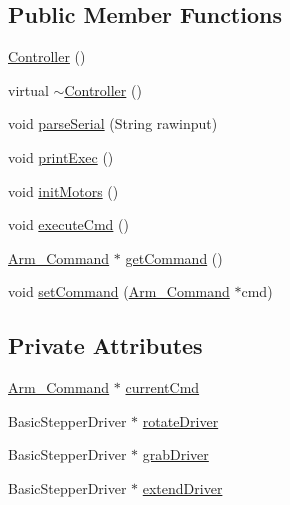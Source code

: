 \subsection*{Public Member Functions}
\begin{DoxyCompactItemize}
\item 
\hyperlink{class_controller_a95c56822d667e94b031451729ce069a9}{Controller} ()
\item 
virtual \hyperlink{class_controller_a0ab87934c4f7a266cfdb86e0f36bc1b5}{$\sim$\+Controller} ()
\item 
void \hyperlink{class_controller_ab539c04f3472ce35d99947d145f95b4b}{parse\+Serial} (String rawinput)
\item 
void \hyperlink{class_controller_a658aa1846a4b44a9f79578ee017a1116}{print\+Exec} ()
\item 
void \hyperlink{class_controller_a02671eb16452b74848f56f954d8dde1a}{init\+Motors} ()
\item 
void \hyperlink{class_controller_a70a36b927bb2df8febae95ed3cb50d63}{execute\+Cmd} ()
\item 
\hyperlink{class_controller_a1b06b7601d97a4d4bb4071938df87076}{Arm\+\_\+\+Command} $\ast$ \hyperlink{class_controller_aaf8bd1fc8842fa7a5544af219adf414c}{get\+Command} ()
\item 
void \hyperlink{class_controller_a59b53351b9037c5cd186e9d32ca37baa}{set\+Command} (\hyperlink{class_controller_a1b06b7601d97a4d4bb4071938df87076}{Arm\+\_\+\+Command} $\ast$cmd)
\end{DoxyCompactItemize}
\subsection*{Private Attributes}
\begin{DoxyCompactItemize}
\item 
\hyperlink{class_controller_a1b06b7601d97a4d4bb4071938df87076}{Arm\+\_\+\+Command} $\ast$ \hyperlink{class_controller_a809d8cb0ecbccb5740b8f72bbed8dd32}{current\+Cmd}
\item 
Basic\+Stepper\+Driver $\ast$ \hyperlink{class_controller_a5678454b560873dfb3197609f1e86199}{rotate\+Driver}
\item 
Basic\+Stepper\+Driver $\ast$ \hyperlink{class_controller_ac48c7b82c23ccff1ffe3ba34225aff41}{grab\+Driver}
\item 
Basic\+Stepper\+Driver $\ast$ \hyperlink{class_controller_a269efb6c442129f6f5f9aca4450d2258}{extend\+Driver}
\end{DoxyCompactItemize}


